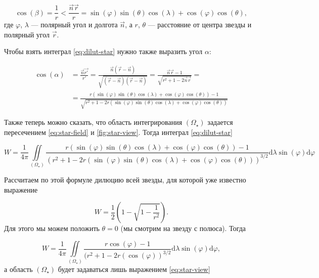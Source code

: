 \documentclass[12pt]{article}
\begin{document}
\begin{equation}\label{eq:star-view}
\cos(\beta) = \frac{1}{r} < \frac{\vec{n}\vec{r}}{r} = \sin(\varphi)\sin(\theta)\cos(\lambda) + \cos(\varphi)\cos(\theta),
\end{equation}
где $\varphi$, $\lambda$ --- полярный угол и долгота $\vec{n}$, а $r$, $\theta$ --- расстояние от центра звезды и полярный угол $\vec{r}$. 

Чтобы взять интеграл \eqref{eq:dilut-star} нужно также выразить угол $\alpha$:

\begin{equation}\label{eq:alpha}
\begin{aligned}
\cos(\alpha) &= \frac{\vec{n}\vec{r'}}{r'} = \frac{\vec{n}(\vec{r}-\vec{n})}{\sqrt{(\vec{r}-\vec{n})(\vec{r}-\vec{n})}} = \frac{\vec{n}\vec{r} - 1}{\sqrt{r^2 + 1 - 2\vec{n}\vec{r}}} = \\ &= \frac{r(\sin(\varphi)\sin(\theta)\cos(\lambda)+\cos(\varphi)\cos(\theta))-1}{\sqrt{r^2+1-2r(\sin(\varphi)\sin(\theta)\cos(\lambda)+\cos(\varphi)\cos(\theta))}}
\end{aligned}
\end{equation}

Также теперь можно сказать, что область интегрирования $(\Omega_\star)$ задается пересечением \eqref{eq:star-field} и \eqref{fig:star-view}. Тогда интеграл \eqref{eq:dilut-star}

\begin{equation}\label{eq:dilut-star-fin}
W = \frac{1}{4\pi}\iint\limits_{(\Omega_\star)}\frac{r(\sin(\varphi)\sin(\theta)\cos(\lambda)+\cos(\varphi)\cos(\theta))-1}{(r^2+1-2r(\sin(\varphi)\sin(\theta)\cos(\lambda)+\cos(\varphi)\cos(\theta)))^{3/2}}\text{d}\lambda\sin(\varphi)\text{d}\varphi
\end{equation}

Рассчитаем по этой формуле дилюцию всей звезды, для которой уже известно выражение

\begin{equation}\label{eq:star-dilut}
W = \frac{1}{2}\left(1 - \sqrt{1-\frac{1}{r^2}}\right).
\end{equation}
Для этого мы можем положить $\theta = 0$ (мы смотрим на звезду с полюса). Тогда

\begin{equation}\label{eq:dilut-simp}
W = \frac{1}{4\pi}\iint\limits_{(\Omega_\star)}\frac{r\cos(\varphi)-1}{(r^2+1-2r(\cos(\varphi))^{3/2}}\text{d}\lambda\sin(\varphi)\text{d}\varphi,
\end{equation}
а область $(\Omega_\star)$ будет задаваться лишь выражением \eqref{eq:star-view}
\end{document}
